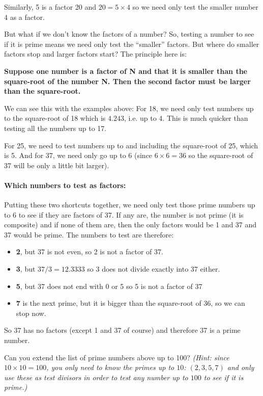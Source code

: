 \documentclass[12pt]{article}
\begin{document}
Similarly, 5 is a factor 20 and $20 = 5 \times 4$ so we need only test the smaller number 4 as a factor.

But what if we don't know the factors of a number? So, testing a number to see if it is prime means we need only test the ``smaller'' factors. But where do smaller factors stop and larger factors start? The principle here is:

\textbf{Suppose one number is a factor of N and that it is smaller than the square-root of the number N. Then the second factor must be larger than the square-root.} 

We can see this with the examples above: For 18, we need only test numbers up to the square-root of 18 which is $4.243$, i.e. up to 4. This is much quicker than testing all the numbers up to 17.

For 25, we need to test numbers up to and including the square-root of 25, which is 5.
And for 37, we need only go up to 6 (since $6 \times 6 = 36$ so the square-root of 37 will be only a little bit larger).

\paragraph{Which numbers to test as factors:} Putting these two shortcuts together, we need only test those prime numbers up to 6 to see if they are factors of 37. If any are, the number is not prime (it is composite) and if none of them are, then the only factors would be 1 and 37 and 37 would be prime.
The numbers to test are therefore:

\begin{itemize}
  \item \textbf{2}, but 37 is not even, so 2 is not a factor of 37.
  \item \textbf{3}, but $37/3 = 12.3333$ so 3 does not divide exactly into 37 either.
  \item \textbf{5}, but 37 does not end with 0 or 5 so 5 is not a factor of 37
  \item \textbf{7} is the next prime, but it is bigger than the square-root of 36, so we can stop now.
\end{itemize}
So 37 has no factors (except 1 and 37 of course) and therefore 37 is a prime number.

Can you extend the list of prime numbers above up to 100? \emph{(Hint: since $10 \times 10 = 100$, you only need to know the primes up to $10$: $(2,3,5,7)$ and only use these as test divisors in order to test any number up to $100$ to see if it is prime.)}
\end{document}
